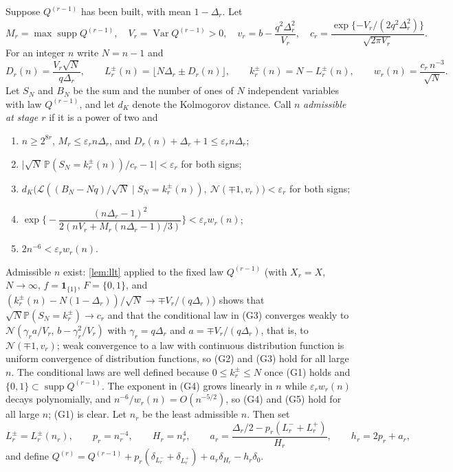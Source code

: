 \documentclass[11pt]{amsart}
\theoremstyle{definition}
\newcommand{\Prob}{\mathbb{P}}
\newcommand{\Law}{\mathcal{L}}
\newcommand{\Nor}{\mathcal{N}}
\newcommand{\Ind}{\mathbf{1}}
\DeclareMathOperator{\Var}{Var}
\DeclareMathOperator{\supp}{supp}
\begin{document}
Suppose $Q^{(r-1)}$ has been built, with mean $1-\Delta_r$. Let
\[
M_r=\max\supp Q^{(r-1)},\quad V_r=\Var Q^{(r-1)}>0,\quad v_r=b-\frac{q^2\Delta_r^2}{V_r},\quad
c_r=\frac{\exp\{-V_r/(2q^2\Delta_r^2)\}}{\sqrt{2\pi V_r}}.
\]
For an integer $n$ write $N=n-1$ and
\begin{equation}\label{eq:critatoms}
D_r(n)=\frac{V_r\sqrt N}{q\Delta_r},\qquad L_r^\pm(n)=\big\lfloor N\Delta_r\pm D_r(n)\big\rfloor,\qquad k_r^\pm(n)=N-L_r^\pm(n),\qquad w_r(n)=\frac{c_r\,n^{-3}}{\sqrt N}.
\end{equation}
Let $S_N$ and $B_N$ be the sum and the number of ones of $N$ independent variables with law $Q^{(r-1)}$, and let $d_K$ denote the Kolmogorov distance. Call $n$ \emph{admissible at stage $r$} if it is a power of two and
\begin{enumerate}
\item[(G1)] $n\ge2^{8r}$, $M_r\le\varepsilon_rn\Delta_r$, and $D_r(n)+\Delta_r+1\le\varepsilon_rn\Delta_r$;
\item[(G2)] $\big|\sqrt N\,\Prob(S_N=k_r^\pm(n))/c_r-1\big|<\varepsilon_r$ for both signs;
\item[(G3)] $d_K\big(\Law((B_N-Nq)/\sqrt N\mid S_N=k_r^\pm(n)),\ \Nor(\mp1,v_r)\big)<\varepsilon_r$ for both signs;
\item[(G4)] $\exp\Big\{-\dfrac{(n\Delta_r-1)^2}{2(nV_r+M_r(n\Delta_r-1)/3)}\Big\}<\varepsilon_rw_r(n)$;
\item[(G5)] $2n^{-6}<\varepsilon_rw_r(n)$.
\end{enumerate}
Admissible $n$ exist: \cref{lem:llt} applied to the fixed law $Q^{(r-1)}$ (with $X_r=X$, $N\to\infty$, $f=\Ind_{\{1\}}$, $F=\{0,1\}$, and $(k_r^\pm(n)-N(1-\Delta_r))/\sqrt N\to\mp V_r/(q\Delta_r)$) shows that $\sqrt N\Prob(S_N=k_r^\pm)\to c_r$ and that the conditional law in (G3) converges weakly to $\Nor(\gamma_ra/V_r,\,b-\gamma_r^2/V_r)$ with $\gamma_r=q\Delta_r$ and $a=\mp V_r/(q\Delta_r)$, that is, to $\Nor(\mp1,v_r)$; weak convergence to a law with continuous distribution function is uniform convergence of distribution functions, so (G2) and (G3) hold for all large $n$. The conditional laws are well defined because $0\le k_r^\pm\le N$ once (G1) holds and $\{0,1\}\subset\supp Q^{(r-1)}$. The exponent in (G4) grows linearly in $n$ while $\varepsilon_rw_r(n)$ decays polynomially, and $n^{-6}/w_r(n)=O(n^{-5/2})$, so (G4) and (G5) hold for all large $n$; (G1) is clear. Let $n_r$ be the least admissible $n$. Then set
\[
L_r^\pm=L_r^\pm(n_r),\qquad p_r=n_r^{-4},\qquad H_r=n_r^4,\qquad a_r=\frac{\Delta_r/2-p_r(L_r^-+L_r^+)}{H_r},\qquad h_r=2p_r+a_r,
\]
and define $Q^{(r)}=Q^{(r-1)}+p_r(\delta_{L_r^-}+\delta_{L_r^+})+a_r\delta_{H_r}-h_r\delta_0$.
\end{document}
